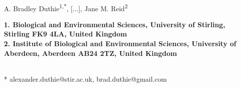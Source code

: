 \documentclass[10pt,letterpaper]{article}
\begin{document}
\vspace*{0.35in}

\begin{flushleft}
{\LARGE
\textbf{}
}
\newline
\\
A. Bradley Duthie\textsuperscript{1,*}, [...],
Jane M. Reid\textsuperscript{2}
\\
\bigskip
\begin{small}
\bf{1.} Biological and Environmental Sciences, University of Stirling, Stirling FK9 4LA, United Kingdom \\
\bf{2.} Institute of Biological and Environmental Sciences, University of Aberdeen, Aberdeen AB24 2TZ, United Kingdom
\end{small}
\\
\bigskip
*  alexander.duthie@stir.ac.uk, brad.duthie@gmail.com

\end{flushleft}
\end{document}
